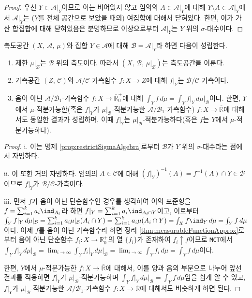 \begin{proof}
    우선 $Y\in\mathcal{A}\vert_Y$이므로 이는 비어있지 않고 임의의 $A\in\mathcal{A}\vert_Y$에 대해 $Y\setminus A\in\mathcal{A}\vert_Y$에서 $\mathcal{A}\vert_Y$는 ($Y$를 전체 공간으로 보았을 때의) 여집합에 대해서 닫혀있다. 한편, 이가 가산 합집합에 대해 닫혀있음은 분명하므로 이상으로부터 $\mathcal{A}\vert_Y$는 $Y$ 위의 $\sigma$-대수이다.
\end{proof}

\begin{theorem}\label{thm:intRistriction}
    측도공간 $(X,\,\mathcal{A},\,\mu)$와 집합 $Y\in\mathcal{A}$에 대해 $\mathcal{B}=\mathcal{A}\vert_Y$라 하면 다음이 성립한다.
    \begin{enumerate}
        \item 제한 $\mu\vert_\mathcal{B}$는 $\mathcal{B}$ 위의 측도이다. 따라서 $(X,\,\mathcal{B},\,\mu\vert_\mathcal{B})$는 측도공간을 이룬다.
        \item 가측공간 $(Z,\,\mathcal{C})$와 $\mathcal{A}/\mathcal{C}$-가측함수 $f:X\to Z$에 대해 $f\vert_Y$는 $\mathcal{B}/\mathcal{C}$-가측이다.
        \item 음이 아닌 $\mathcal{A}/\mathcal{B}_1$-가측함수 $f:X\to\overline{\mathbb{R}}^+_0$에 대해 $\int_Yf\,d\mu=\int_Yf\vert_Y\,d\mu\vert_{\mathcal{B}}$이다. 한편, $Y$에서 $\mu$-적분가능한(혹은 $f\vert_Y$가 $\mu\vert_\mathcal{B}$-적분가능한 $\mathcal{A}/\mathcal{B}_1$-가측함수) $f:X\to\overline{\mathbb{R}}$에 대해서도 동일한 결과가 성립하며, 이때 $f\vert_Y$는 $\mu\vert_\mathcal{B}$-적분가능하다(혹은 $f$는 $Y$에서 $\mu$-적분가능하다).
    \end{enumerate}
\end{theorem}

\begin{proof}
    i. 이는 명제 \ref{prop:restrictSigmaAlgebra}로부터 $\mathcal{B}$가 $Y$ 위의 $\sigma$-대수라는 점에서 자명하다.

    ii. 이 또한 거의 자명하다. 임의의 $A\in\mathcal{C}$에 대해 $(f\vert_Y)^{-1}(A)=f^{-1}(A)\cap Y\in\mathcal{B}$이므로 $f\vert_Y$가 $\mathcal{B}/\mathcal{C}$-가측이다.
    
    iii. 먼저 $f$가 음이 아닌 단순함수인 경우를 생각하여 이의 표준형을 $f=\sum_{i=1}^ka_i\ind_{A_i}$라 하면 $f\vert_Y=\sum_{i=1}^ka_i\ind_{A_i\cap Y}$이고, 이로부터 $\int_Yf\vert_Y\,d\mu\vert_\mathcal{B}=\sum_{i=1}^ka_i\mu\vert_\mathcal{B}(A_i\cap Y)=\sum_{i=1}^ka_i\mu(A_i\cap Y)=\int_Xf\ind_Y\,d\mu=\int_Yf\,d\mu$이다. 이제 $f$를 음이 아닌 가측함수라 하면 정리 \ref{thm:measurableFunctionApprox}로부터 음이 아닌 단순함수 $f_i:X\to\mathbb{R}^+_0$의 열 $\{f_i\}$가 존재하여 $f_i\uparrow f$이므로 \texttt{MCT}에서 $\int_Yf\vert_Y\,d\mu\vert_\mathcal{B}=\lim_{i\to\infty}\int_Yf_i\vert_Y\,d\mu\vert_\mathcal{B}=\lim_{i\to\infty}\int_Yf_i\,d\mu=\int_Yf\,d\mu$이다.

    한편, $Y$에서 $\mu$-적분가능한 $f:X\to\overline{\mathbb{R}}$에 대해서, 이를 양과 음의 부분으로 나누어 앞선 결과를 적용하면 $f\vert_Y$가 $\mu\vert_\mathcal{B}$-적분가능하며 $\int_Yf\vert_Y\,d\mu\vert_{\mathcal{B}}=\int_Yf\,d\mu$임을 쉽게 알 수 있고, $f\vert_Y$가 $\mu\vert_\mathcal{B}$-적분가능한 $\mathcal{A}/\mathcal{B}_1$-가측함수 $f:X\to\overline{\mathbb{R}}$에 대해서도 비슷하게 하면 된다.
\end{proof}

